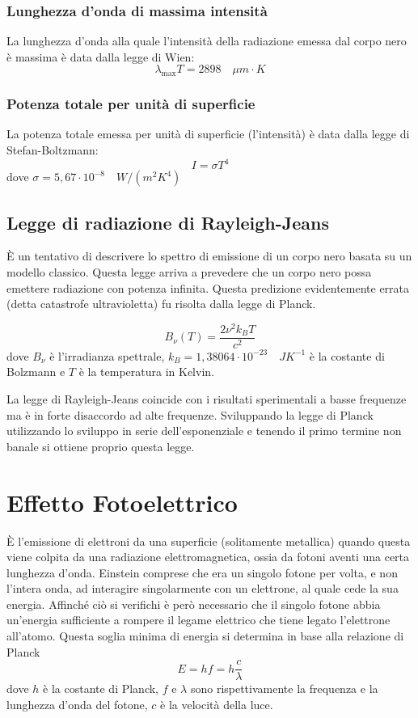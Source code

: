 \documentclass[10pt,a4paper]{article}
\begin{document}
\begin{multicols}{2}
  \subsubsection*{Lunghezza d'onda di massima intensità}
  La lunghezza d'onda alla quale l'intensità della radiazione emessa dal corpo nero è massima è data dalla legge di Wien:
  $$ \lambda_\text{max} T = 2898 \quad \mu m \cdot K $$

  \subsubsection*{Potenza totale per unità di superficie}
  La potenza totale emessa per unità di superficie (l'intensità) è data dalla legge di Stefan-Boltzmann:
  $$ I = \sigma T^4 $$
  dove $\sigma = 5,67 \cdot 10^{-8} \quad W / (m^2 K^4)$

  \subsection*{Legge di radiazione di Rayleigh-Jeans}
  È un tentativo di descrivere lo spettro di emissione di un corpo nero basata su un modello classico. Questa legge arriva a prevedere che un corpo nero possa emettere radiazione con potenza infinita. Questa predizione evidentemente errata (detta catastrofe ultravioletta) fu risolta dalla legge di Planck.

  $$ B_\nu (T) = \frac{2 \nu^2 k_B T}{c^2} $$
  dove $B_\nu$ è l'irradianza spettrale, $k_B = 1,38064 \cdot 10^{-23} \quad J K^{-1}$ è la costante di Bolzmann e $T$ è la temperatura in Kelvin.

  La legge di Rayleigh-Jeans coincide con i risultati sperimentali a basse frequenze ma è in forte disaccordo ad alte frequenze. Sviluppando la legge di Planck utilizzando lo sviluppo in serie dell'esponenziale e tenendo il primo termine non banale si ottiene proprio questa legge.

  \section*{Effetto Fotoelettrico}
  È l'emissione di elettroni da una superficie (solitamente metallica) quando questa viene colpita da una radiazione elettromagnetica, ossia da fotoni aventi una certa lunghezza d'onda. Einstein comprese che era un singolo fotone per volta, e non l'intera onda, ad interagire singolarmente con un elettrone, al quale cede la sua energia. Affinché ciò si verifichi è però necessario che il singolo fotone abbia un'energia sufficiente a rompere il legame elettrico che tiene legato l'elettrone all'atomo. Questa soglia minima di energia si determina in base alla relazione di Planck
  $$ E = hf = h \frac{c}{\lambda} $$
  dove $h$ è la costante di Planck, $f$ e $\lambda$ sono rispettivamente la frequenza e la lunghezza d'onda del fotone, $c$ è la velocità della luce.


\end{multicols}
\end{document}
